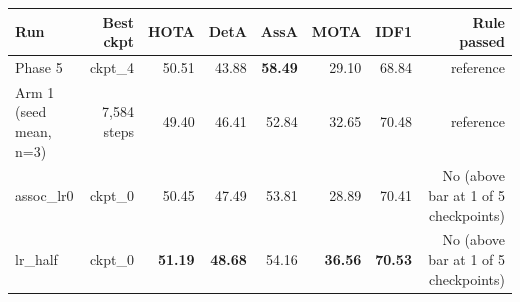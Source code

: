 \begin{tabular}{lrrrrrrr}
\toprule
Run & Best ckpt & HOTA & DetA & AssA & MOTA & IDF1 & Rule passed \\
\midrule
Phase 5 & ckpt\_4 & 50.51 & 43.88 & \textbf{58.49} & 29.10 & 68.84 & reference \\
Arm 1 (seed mean, n=3) & 7,584 steps & 49.40 & 46.41 & 52.84 & 32.65 & 70.48 & reference \\
assoc\_lr0 & ckpt\_0 & 50.45 & 47.49 & 53.81 & 28.89 & 70.41 & No (above bar at 1 of 5 checkpoints) \\
lr\_half & ckpt\_0 & \textbf{51.19} & \textbf{48.68} & 54.16 & \textbf{36.56} & \textbf{70.53} & No (above bar at 1 of 5 checkpoints) \\
\bottomrule
\end{tabular}
